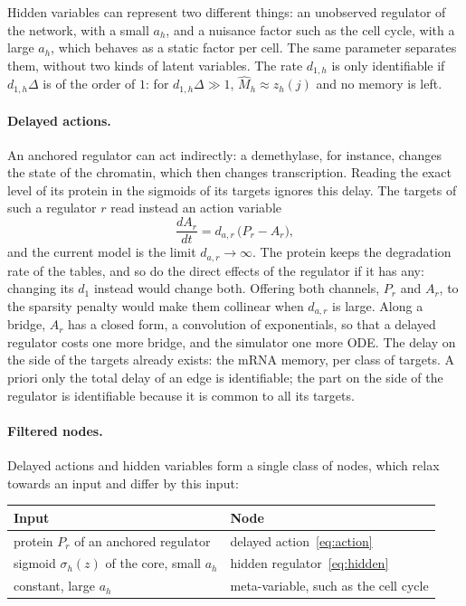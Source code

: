 \documentclass[a4paper, 11pt]{article}
\theoremstyle{plain}
\theoremstyle{remark}
\begin{document}
Hidden variables can represent two different things: an unobserved regulator of the network, with a small $a_h$, and a nuisance factor such as the cell cycle, with a large $a_h$, which behaves as a static factor per cell. The same parameter separates them, without two kinds of latent variables. The rate $d_{1,h}$ is only identifiable if $d_{1,h}\Delta$ is of the order of $1$: for $d_{1,h}\Delta \gg 1$, $\widehat M_h \approx z_h(j)$ and no memory is left.

\paragraph{Delayed actions.} An anchored regulator can act indirectly: a demethylase, for instance, changes the state of the chromatin, which then changes transcription. Reading the exact level of its protein in the sigmoids of its targets ignores this delay. The targets of such a regulator $r$ read instead an action variable
\begin{equation}\label{eq:action}
\frac{dA_r}{dt} = d_{a,r}\,\big(P_r - A_r\big),
\end{equation}
and the current model is the limit $d_{a,r} \to \infty$. The protein keeps the degradation rate of the tables, and so do the direct effects of the regulator if it has any: changing its $d_1$ instead would change both. Offering both channels, $P_r$ and $A_r$, to the sparsity penalty would make them collinear when $d_{a,r}$ is large. Along a bridge, $A_r$ has a closed form, a convolution of exponentials, so that a delayed regulator costs one more bridge, and the simulator one more ODE. The delay on the side of the targets already exists: the mRNA memory, per class of targets. A priori only the total delay of an edge is identifiable; the part on the side of the regulator is identifiable because it is common to all its targets.

\paragraph{Filtered nodes.} Delayed actions and hidden variables form a single class of nodes, which relax towards an input and differ by this input:
\begin{center}
\begin{tabular}{@{}p{}p{}@{}}
\toprule
Input & Node \\
\midrule
protein $P_r$ of an anchored regulator & delayed action~\eqref{eq:action} \\
sigmoid $\sigma_h(z)$ of the core, small $a_h$ & hidden regulator~\eqref{eq:hidden} \\
constant, large $a_h$ & meta-variable, such as the cell cycle \\
\bottomrule
\end{tabular}
\end{center}
\end{document}
